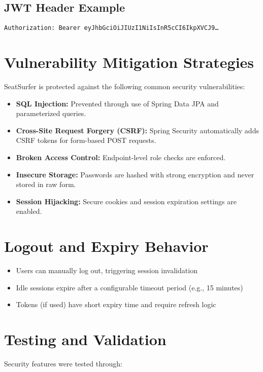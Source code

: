 \documentclass[12pt,a4paper]{report}
\begin{document}
\subsection*{JWT Header Example}

\texttt{Authorization: Bearer eyJhbGciOiJIUzI1NiIsInR5cCI6IkpXVCJ9…}

\section{Vulnerability Mitigation Strategies}

SeatSurfer is protected against the following common security vulnerabilities:

\begin{itemize}
    \item \textbf{SQL Injection:} Prevented through use of Spring Data JPA and parameterized queries.
    \item \textbf{Cross-Site Request Forgery (CSRF):} Spring Security automatically adds CSRF tokens for form-based POST requests.
    \item \textbf{Broken Access Control:} Endpoint-level role checks are enforced.
    \item \textbf{Insecure Storage:} Passwords are hashed with strong encryption and never stored in raw form.
    \item \textbf{Session Hijacking:} Secure cookies and session expiration settings are enabled.
\end{itemize}

\section{Logout and Expiry Behavior}

\begin{itemize}
    \item Users can manually log out, triggering session invalidation
    \item Idle sessions expire after a configurable timeout period (e.g., 15 minutes)
    \item Tokens (if used) have short expiry time and require refresh logic
\end{itemize}

\section{Testing and Validation}

Security features were tested through:
\end{document}
